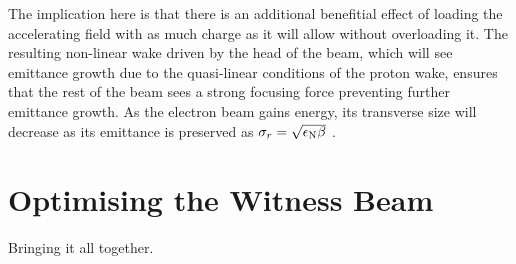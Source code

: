 The implication here is that there is an additional benefitial effect of loading the accelerating field with as much charge as it will allow without overloading it. The resulting non-linear wake driven by the head of the beam, which will see emittance growth due to the quasi-linear conditions of the proton wake, ensures that the rest of the beam sees a strong focusing force preventing further emittance growth. As the electron beam gains energy, its transverse size will decrease as its emittance is preserved as $\sigma_{r} = \sqrt{\epsilon_{\mathrm{N}}\beta}$ \cite{wille:2001}.


\section{Optimising the Witness Beam}
\label{Sim:Opt}

Bringing it all together.

